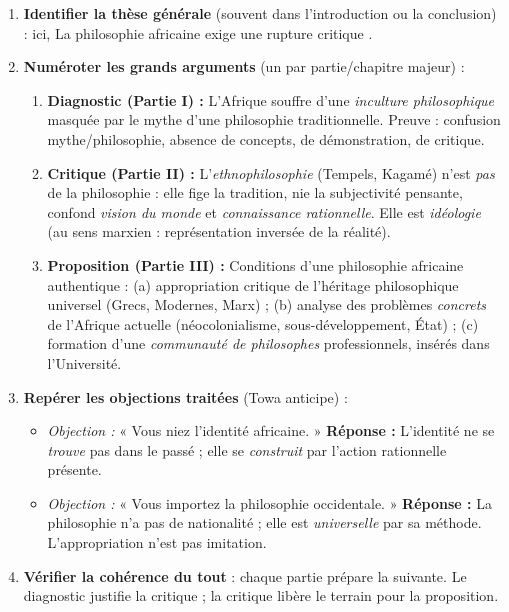 \documentclass[11pt]{article}
\begin{document}
\begin{methode}
\begin{enumerate}
\item \textbf{Identifier la thèse générale} (souvent dans l'introduction ou la conclusion) : ici, \guillemotleft La philosophie africaine exige une rupture critique \guillemotright.
\item \textbf{Numéroter les grands arguments} (un par partie/chapitre majeur) :
      \begin{enumerate}
      \item \textbf{Diagnostic (Partie I) :} L'Afrique souffre d'une \emph{inculture philosophique} masquée par le mythe d'une philosophie traditionnelle. Preuve : confusion mythe/philosophie, absence de concepts, de démonstration, de critique.
      \item \textbf{Critique (Partie II) :} L'\emph{ethnophilosophie} (Tempels, Kagamé) n'est \emph{pas} de la philosophie : elle fige la tradition, nie la subjectivité pensante, confond \emph{vision du monde} et \emph{connaissance rationnelle}. Elle est \emph{idéologie} (au sens marxien : représentation inversée de la réalité).
      \item \textbf{Proposition (Partie III) :} Conditions d'une philosophie africaine authentique : (a) appropriation critique de l'héritage philosophique universel (Grecs, Modernes, Marx) ; (b) analyse des problèmes \emph{concrets} de l'Afrique actuelle (néocolonialisme, sous-développement, État) ; (c) formation d'une \emph{communauté de philosophes} professionnels, insérés dans l'Université.
      \end{enumerate}
\item \textbf{Repérer les objections traitées} (Towa anticipe) :
      \begin{itemize}
      \item \emph{Objection :} « Vous niez l'identité africaine. » \textbf{Réponse :} L'identité ne se \emph{trouve} pas dans le passé ; elle se \emph{construit} par l'action rationnelle présente.
      \item \emph{Objection :} « Vous importez la philosophie occidentale. » \textbf{Réponse :} La philosophie n'a pas de nationalité ; elle est \emph{universelle} par sa méthode. L'appropriation n'est pas imitation.
      \end{itemize}
\item \textbf{Vérifier la cohérence du tout} : chaque partie prépare la suivante. Le diagnostic justifie la critique ; la critique libère le terrain pour la proposition.
\end{enumerate}
\end{methode}
\end{document}
